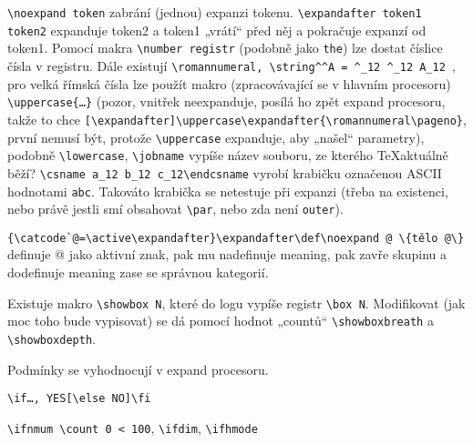 \documentclass[12pt]{article}					%
\begin{document}
\begin{definice}
        \verb|\noexpand token| zabrání (jednou) expanzi tokenu. \verb|\expandafter token1 token2| expanduje token2 a token1 „vrátí“ před něj a pokračuje expanzí od token1. Pomocí makra \verb|\number registr| (podobně jako \verb|the|) lze dostat číslice čísla v registru. Dále existují \verb|\romannumeral, \string^^A = ^_12 ^_12 A_12 |, pro velká římská čísla lze použít makro (zpracovávající se v hlavním procesoru) \verb|\uppercase{…}| (pozor, vnitřek neexpanduje, posílá ho zpět expand procesoru, takže to chce \verb|[\expandafter]\uppercase\expandafter{\romannumeral\pageno}|, první nemusí být, protože \verb|\uppercase| expanduje, aby „našel“ parametry), podobně \verb|\lowercase|, \verb|\jobname| vypíše název souboru, ze kterého \TeX aktuálně běží? \verb|\csname a_12 b_12 c_12\endcsname| vyrobí krabičku označenou ASCII hodnotami \verb|abc|. Takováto krabička se netestuje při expanzi (třeba na existenci, nebo právě jestli smí obsahovat \verb|\par|, nebo zda není \verb|outer|).
    \end{definice}

    \begin{priklad}
        \verb|{\catcode`@=\active\expandafter}\expandafter\def\noexpand @ \{tělo @\}| definuje @ jako aktivní znak, pak mu nadefinuje meaning, pak zavře skupinu a dodefinuje meaning zase se správnou kategorií.
    \end{priklad}

    \begin{poznamka}[Debug]
        Existuje makro \verb|\showbox N|, které do logu vypíše registr \verb|\box N|. Modifikovat (jak moc toho bude vypisovat) se dá pomocí hodnot „countů“ \verb|\showboxbreath| a \verb|\showboxdepth|.
    \end{poznamka}

    \begin{definice}[Podmínky]
        Podmínky se vyhodnocují v expand procesoru.
        
        \verb|\if…, YES[\else NO]\fi|

        \verb|\ifnmum \count 0 < 100|, \verb|\ifdim|, \verb|\ifhmode|
    \end{definice}
\end{document}
